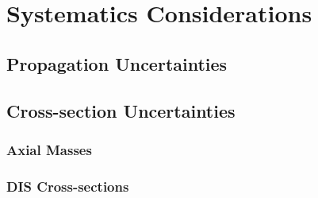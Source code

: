 \section{Systematics Considerations}

\label{subsec:oscillation_params}




\label{subsec:propagation_systematics}
\subsection{Propagation Uncertainties}

\label{subsec:xsec_systematics}
\subsection{Cross-section Uncertainties}

\label{subsubsec:axial_masses}
\subsubsection{Axial Masses}

\label{subsubsec:dis_systematics}
\subsubsection{DIS Cross-sections}

\label{subsec:detector_systematics}
